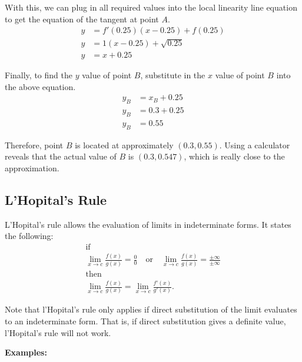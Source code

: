 With this, we can plug in all required values into the local linearity line equation to get the equation of the tangent at point $A$.
\begin{align*}
	y &= f'(0.25) (x - 0.25) + f(0.25) \\
	y &= 1 (x - 0.25) + \sqrt{0.25} \\
	y &= x + 0.25
\end{align*}

Finally, to find the $y$ value of point $B$, substitute in the $x$ value of point $B$ into the above equation.
\begin{align*}
	y_B &= x_B + 0.25 \\
	y_B &= 0.3 + 0.25 \\
	y_B &= 0.55
\end{align*}

Therefore, point $B$ is located at approximately $(0.3, 0.55)$. Using a calculator reveals that the actual value of $B$ is $(0.3, 0.547)$, which is really close to the approximation.

\subsection{L'Hopital's Rule}
L'Hopital's rule allows the evaluation of limits in indeterminate forms. It states the following:
\begin{gather*}
	\text{if} \\
	\lim_{x \to c} \frac{f(x)}{g(x)} = \frac{0}{0} \quad \text{or} \quad \lim_{x \to c} \frac{f(x)}{g(x)} = \frac{\pm \infty}{\pm \infty} \\
	\text{then} \\
	\lim_{x \to c} \frac{f(x)}{g(x)} = \lim_{x \to c} \frac{f'(x)}{g'(x)}.
\end{gather*}

Note that l'Hopital's rule only applies if direct substitution of the limit evaluates to an indeterminate form. That is, if direct substitution gives a definite value, l'Hopital's rule will not work.

\noindent \textbf{Examples:}

